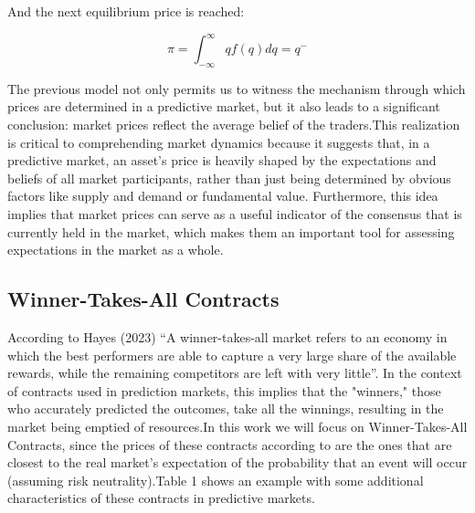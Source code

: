 And the next equilibrium price is reached:

\begin{equation}
    \pi = \int_{-\infty}^{\infty} q f(q) dq = q^-
\end{equation}

The previous model not only permits us to witness the mechanism through which prices are determined in a predictive market, but it also leads to a significant conclusion: market prices reflect the average belief of the traders.This realization is critical to comprehending market dynamics because it suggests that, in a predictive market, an asset's price is heavily shaped by the expectations and beliefs of all market participants, rather than just being determined by obvious factors like supply and demand or fundamental value. Furthermore, this idea implies that market prices can serve as a useful indicator of the consensus that is currently held in the market, which makes them an important tool for assessing expectations in the market as a whole. 

\subsection{Winner-Takes-All Contracts}
\label{subsec:winner_takes_all_contracts}

According to Hayes (2023) “A winner-takes-all market refers to an economy in which the best performers are able to capture a very large share of the available rewards, while the remaining competitors are left with very little”. In the context of contracts used in prediction markets, this implies that the "winners," those who accurately predicted the outcomes, take all the winnings, resulting in the market being emptied of resources.In this work we will focus on Winner-Takes-All Contracts, since the prices of these contracts according to \cite{Zitzewitz2004} are the ones that are closest to the real market's expectation of the probability that an event will occur (assuming risk neutrality).Table 1 shows an example with some additional characteristics of these contracts in predictive markets.

